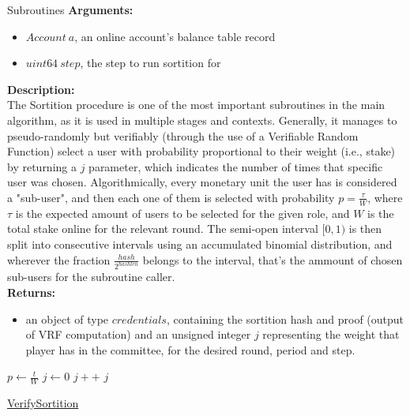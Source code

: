 \documentclass[10pt,a4paper]{article}
\begin{document}
\begin{section}{Subroutines}
\noindent \textbf{Arguments:}
\begin{itemize}
    \item $Account \ a$, an online account's balance table record
    \item $uint64 \ step$, the step to run sortition for
\end{itemize}

\noindent \textbf{Description:}\\
The Sortition procedure is one of the most important subroutines in the main algorithm, as it is 
used in multiple stages and contexts.
Generally, it manages to pseudo-randomly but verifiably (through the use of a Verifiable Random 
Function) select a user with probability proportional
to their weight (i.e., stake) by returning a $j$ parameter, which indicates the number of times that 
specific user was chosen.
Algorithmically, every monetary unit the user has is considered a "sub-user", and then each one 
of them is selected with probability $p = \frac{\tau}{W}$,
where $\tau$ is the expected amount of users to be selected for the given role, and $W$ is the total
stake online for the relevant round.
The semi-open interval $[0,1)$ is then split into consecutive intervals using an accumulated 
binomial distribution, and wherever the fraction $\frac{hash}{2^{hashlen}}$
belongs to the interval, that's the ammount of chosen sub-users for the subroutine caller.\\

\noindent \textbf{Returns:}
\begin{itemize}
    \item an object of type $credentials$, containing the sortition hash and proof (output of VRF
    computation) and an unsigned integer $j$ representing the weight that player has in the committee,
    for the desired round, period and step.
  \end{itemize}



\begin{algorithm}[H]
    \begin{algorithmic}[1]
        \State $p \gets \frac{t}{W}$
        \State $j \gets 0$
        \While{$\frac{hash}{2^{hashlen}} \notin [\sum_{k=0}^j\mathsf{B}(k;w,p), \sum_{k=0}^{j+1}\mathsf{B}(k;w,p))$}
            \State $j++$
        \EndWhile
        \Return $j$
    \EndFunction
    \end{algorithmic}
    \caption{\underline{VerifySortition}}
\end{algorithm}


\end{section}
\end{document}

